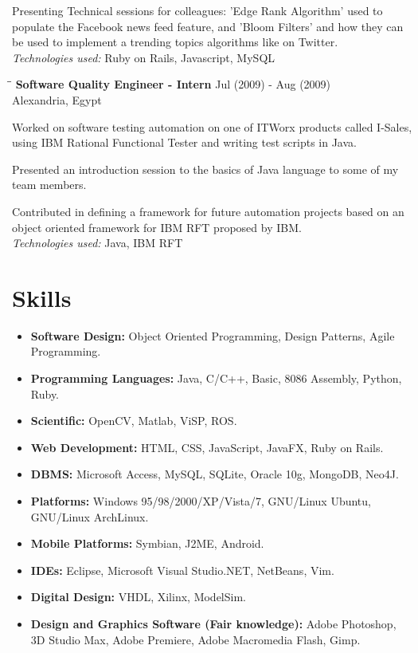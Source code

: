 \documentclass{res}
\begin{document}
\begin{resume}
   Presenting Technical sessions for colleagues: 'Edge Rank Algorithm' used to populate the Facebook news feed feature, and 'Bloom Filters' and how they can be used to implement a trending topics algorithms like on Twitter.\\
    {\sl Technologies used:} Ruby on Rails, Javascript, MySQL

   \begin{tabbing}
   \hspace{2.7in}\= \hspace{1.8in}\= \kill %
    {\bf Software Quality Engineer - Intern}\> \hfill Jul (2009) - Aug (2009)\\
                                    \>Alexandria, Egypt
   \end{tabbing}\vspace{-20pt}      %
   Worked on software testing automation on one of ITWorx products called I-Sales, using IBM Rational Functional Tester and writing test scripts in Java.

   Presented an introduction session to the basics of Java language to some of my team members.

   Contributed in defining a framework for future automation projects based on an object oriented framework for IBM RFT proposed by IBM.\\
    {\sl Technologies used:} Java, IBM RFT


\section{Skills}
  \begin{itemize}[leftmargin=*]
      \item \textbf{Software Design:} Object Oriented Programming, Design Patterns, Agile Programming.
      \item \textbf{Programming Languages:} Java, C/C++, Basic, 8086 Assembly, Python, Ruby.
      \item \textbf{Scientific:} OpenCV, Matlab, ViSP, ROS.
      \item \textbf{Web Development:} HTML, CSS, JavaScript, JavaFX, Ruby on Rails.
      \item \textbf{DBMS:} Microsoft Access, MySQL, SQLite, Oracle 10g, MongoDB, Neo4J.
      \item \textbf{Platforms:} Windows 95/98/2000/XP/Vista/7, GNU/Linux Ubuntu, GNU/Linux ArchLinux.
      \item \textbf{Mobile Platforms:} Symbian, J2ME, Android.
      \item \textbf{IDEs:} Eclipse, Microsoft Visual Studio.NET, NetBeans, Vim.
      \item \textbf{Digital Design:} VHDL, Xilinx, ModelSim.
      \item \textbf{Design and Graphics Software (Fair knowledge):} Adobe Photoshop, 3D Studio Max, Adobe Premiere, Adobe Macromedia Flash, Gimp.
    \end{itemize}


\end{resume}
\end{document}
